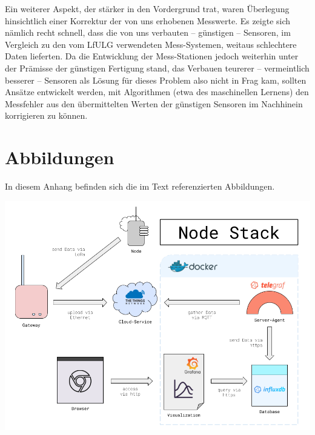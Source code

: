 \documentclass[a4paper,11pt]{article}
\begin{document}
Ein weiterer Aspekt, der stärker in den Vordergrund trat, waren Überlegung
hinsichtlich einer Korrektur der von uns erhobenen Messwerte. Es zeigte sich
nämlich recht schnell, dass die von uns verbauten -- günstigen -- Sensoren, im
Vergleich zu den vom LfULG verwendeten Mess-Systemen, weitaus schlechtere Daten
lieferten. Da die Entwicklung der Mess-Stationen jedoch weiterhin unter der
Prämisse der günstigen Fertigung stand, das Verbauen teurerer -- vermeintlich
besserer -- Sensoren als Lösung für dieses Problem also nicht in Frag kam,
sollten Ansätze entwickelt werden, mit Algorithmen (etwa des maschinellen
Lernens) den Messfehler aus den übermittelten Werten der günstigen Sensoren im
Nachhinein korrigieren zu können.

\pagebreak
\appendix
\section{Abbildungen}

In diesem Anhang befinden sich die im Text referenzierten Abbildungen. 

\bigskip\noindent
\begin{minipage}{\linewidth}
  \captionsetup{format=plain, labelfont=bf, font=small} \centering
  \includegraphics[width=\linewidth]{img/Node_Stack.png}
\end{minipage}
\end{document}
